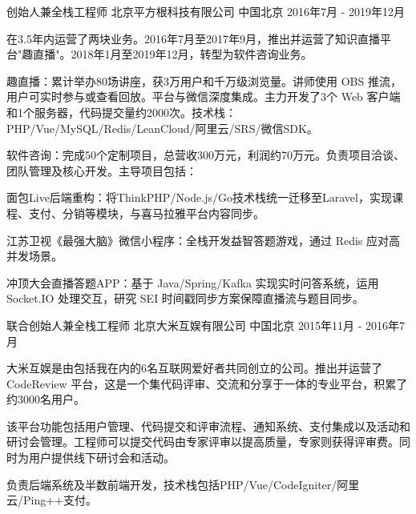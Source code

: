 \begin{cventries}
\cventry
{创始人兼全栈工程师} %
{北京平方根科技有限公司} %
{中国北京} %
{2016年7月 - 2019年12月} %
{
  \begin{cvitems} %
    \item {在3.5年内运营了两块业务。2016年7月至2017年9月，推出并运营了知识直播平台"趣直播"。2018年1月至2019年12月，转型为软件咨询业务。}
    \item {趣直播：累计举办80场讲座，获3万用户和千万级浏览量。讲师使用 OBS 推流，用户可实时参与或查看回放。平台与微信深度集成。主力开发了3个 Web 客户端和1个服务器，代码提交量约2000次。技术栈：PHP/Vue/MySQL/Redis/LeanCloud/阿里云/SRS/微信SDK。}
    \item {软件咨询：完成50个定制项目，总营收300万元，利润约70万元。负责项目洽谈、团队管理及核心开发。主导项目包括：}
    \item {面包Live后端重构：将ThinkPHP/Node.js/Go技术栈统一迁移至Laravel，实现课程、支付、分销等模块，与喜马拉雅平台内容同步。}
    \item {江苏卫视《最强大脑》微信小程序：全栈开发益智答题游戏，通过 Redis 应对高并发场景。}
    \item {冲顶大会直播答题APP：基于 Java/Spring/Kafka 实现实时问答系统，运用 Socket.IO 处理交互，研究 SEI 时间戳同步方案保障直播流与题目同步。}
  \end{cvitems}
}

\cventry
{联合创始人兼全栈工程师} %
{北京大米互娱有限公司} %
{中国北京} %
{2015年11月 - 2016年7月} %
{
  \begin{cvitems} %
    \item {大米互娱是由包括我在内的6名互联网爱好者共同创立的公司。推出并运营了 CodeReview 平台，这是一个集代码评审、交流和分享于一体的专业平台，积累了约3000名用户。}
    \item {该平台功能包括用户管理、代码提交和评审流程、通知系统、支付集成以及活动和研讨会管理。工程师可以提交代码由专家评审以提高质量，专家则获得评审费。同时为用户提供线下研讨会和活动。}
    \item {负责后端系统及半数前端开发，技术栈包括PHP/Vue/CodeIgniter/阿里云/Ping++支付。}
  \end{cvitems}
}


\end{cventries}
